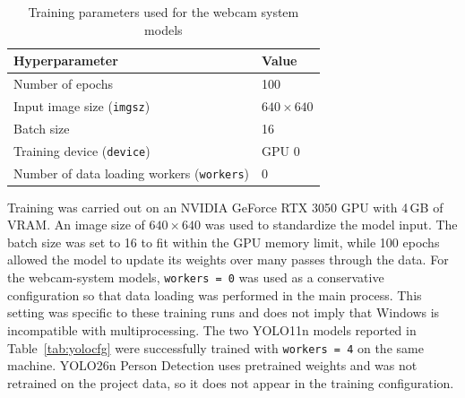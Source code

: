 \begin{table}[htbp]
\centering
\caption{Training parameters used for the webcam system models}
\label{tab:hyperparams}
\small
\begin{tabular}{R{6.2cm}R{7.0cm}}
\hline
\textbf{Hyperparameter} & \textbf{Value} \\
\hline
Number of epochs & 100 \\
Input image size (\texttt{imgsz}) & $640 \times 640$ \\
Batch size & 16 \\
Training device (\texttt{device}) & GPU 0 \\
Number of data loading workers (\texttt{workers}) & 0 \\
\hline
\end{tabular}
\end{table}

Training was carried out on an NVIDIA GeForce RTX 3050 GPU with 4\,GB of VRAM. An image size of $640 \times 640$ was used to standardize the model input. The batch size was set to 16 to fit within the GPU memory limit, while 100 epochs allowed the model to update its weights over many passes through the data. For the webcam-system models, \texttt{workers = 0} was used as a conservative configuration so that data loading was performed in the main process. This setting was specific to these training runs and does not imply that Windows is incompatible with multiprocessing. The two YOLO11n models reported in Table~\ref{tab:yolocfg} were successfully trained with \texttt{workers = 4} on the same machine. YOLO26n Person Detection uses pretrained weights and was not retrained on the project data, so it does not appear in the training configuration.
